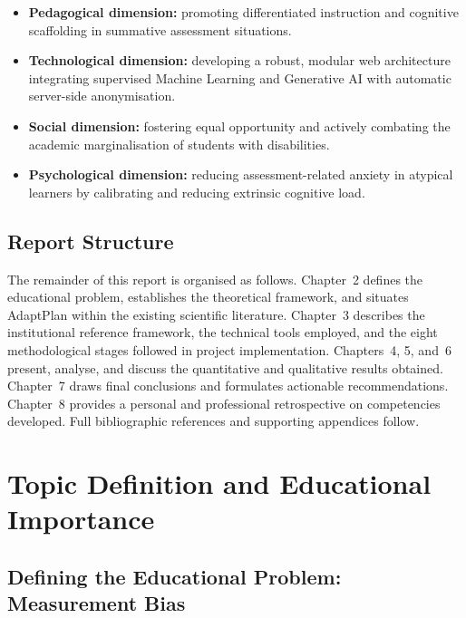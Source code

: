 \documentclass[12pt,a4paper]{report}
\begin{document}
\begin{itemize}[leftmargin=*]
  \item \textbf{Pedagogical dimension:} promoting differentiated instruction and cognitive scaffolding in summative assessment situations.
  \item \textbf{Technological dimension:} developing a robust, modular web architecture integrating supervised Machine Learning and Generative AI with automatic server-side anonymisation.
  \item \textbf{Social dimension:} fostering equal opportunity and actively combating the academic marginalisation of students with disabilities.
  \item \textbf{Psychological dimension:} reducing assessment-related anxiety in atypical learners by calibrating and reducing extrinsic cognitive load.
\end{itemize}

\section{Report Structure}

The remainder of this report is organised as follows. Chapter~2 defines the educational problem, establishes the theoretical framework, and situates AdaptPlan within the existing scientific literature. Chapter~3 describes the institutional reference framework, the technical tools employed, and the eight methodological stages followed in project implementation. Chapters~4, 5, and~6 present, analyse, and discuss the quantitative and qualitative results obtained. Chapter~7 draws final conclusions and formulates actionable recommendations. Chapter~8 provides a personal and professional retrospective on competencies developed. Full bibliographic references and supporting appendices follow.

\newpage

\chapter{Topic Definition and Educational Importance}

\section{Defining the Educational Problem: Measurement Bias}
\end{document}
